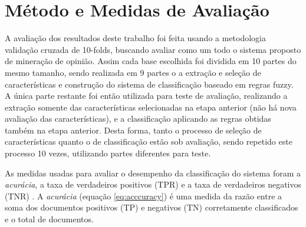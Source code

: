 \documentclass[template.tex]{subfiles}
\begin{document}

\section{Método e Medidas de Avaliação}

A avaliação dos resultados deste trabalho foi feita usando a metodologia validação cruzada de 10-folds, buscando avaliar como um todo o sistema proposto de mineração de opinião. Assim cada base escolhida foi dividida em 10 partes do mesmo tamanho, sendo realizada em 9 partes o a extração e seleção de características e construção do sistema de classificação baseado em regras fuzzy. A única parte restante foi então utilizada para teste de avaliação, realizando a extração somente das características selecionadas na etapa anterior (não há nova avaliação das características), e a classificação aplicando as regras obtidas também na etapa anterior. Desta forma, tanto o processo de seleção de características quanto o de classificação estão sob avaliação, sendo repetido este processo 10 vezes, utilizando partes diferentes para teste.




As medidas usadas para avaliar o desempenho da classificação do sistema foram a \textit{acurácia}, a taxa de verdadeiros positivos (TPR) e a taxa de verdadeiros negativos (TNR) \cite{garcia2012multi}. A \textit{acurácia} (equação \ref{eq:acccuracy}) é uma medida da razão entre a soma dos documentos positivos (TP) e negativos (TN) corretamente classificados e o total de documentos.
\end{document}
